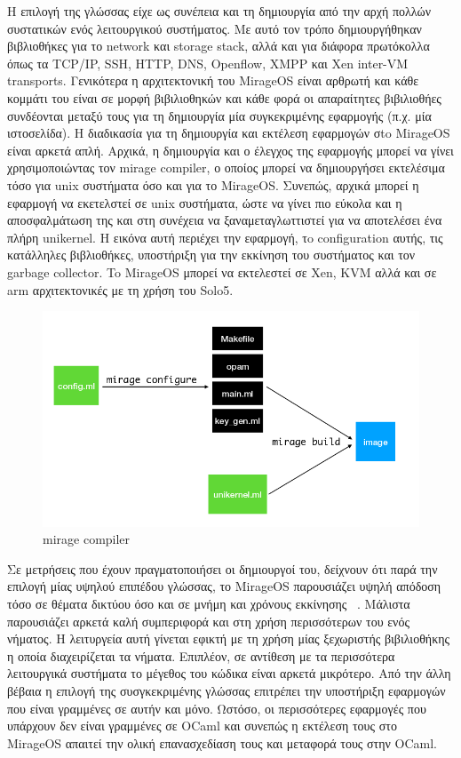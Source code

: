 Η επιλογή της γλώσσας είχε ως συνέπεια και τη δημιουργία από την αρχή πολλών
συστατικών ενός λειτουργικού συστήματος. Με αυτό τον τρόπο δημιουργήθηκαν
βιβλιοθήκες για το network και storage stack, αλλά και για διάφορα πρωτόκολλα
όπως τα TCP/IP, SSH, HTTP, DNS, Openflow, XMPP και Xen inter-VM transports.
Γενικότερα η αρχιτεκτονική του MirageOS είναι αρθρωτή και κάθε κομμάτι του είναι
σε μορφή βιβιλιοθηκών και κάθε φορά οι απαραίτητες βιβιλιοθήες συνδέονται μεταξύ
τους για τη δημιουργία μία συγκεκριμένης εφαρμογής (π.χ. μία ιστοσελίδα). H
διαδικασία για τη δημιουργία και εκτέλεση εφαρμογών σto MirageOS είναι αρκετά
απλή. Αρχικά, η δημιουργία και ο έλεγχος της εφαρμογής μπορεί να γίνει
χρησιμοποιώντας τον mirage compiler, ο οποίος μπορεί να δημιουργήσει εκτελέσιμα
τόσο για unix συστήματα όσο και για το MirageOS. Συνεπώς, αρχικά μπορεί η
εφαρμογή να εκετελστεί σε unix συστήματα, ώστε να γίνει πιο εύκολα και η
αποσφαλμάτωση της και στη συνέχεια να ξαναμεταγλωττιστεί για να αποτελέσει ένα
πλήρη unikernel. Η εικόνα αυτή περιέχει την εφαρμογή, τo configuration
αυτής, τις κατάλληλες βιβλιοθήκες, υποστήριξη για την εκκίνηση του συστήματος
και τον garbage collector. To MirageOS μπορεί να εκτελεστεί σε Xen, KVM αλλά και
σε arm αρχιτεκτονικές με τη χρήση του Solo5. 

\begin{figure}[htp]
\centering
\includegraphics[scale=0.5]{figures/mirage_compiler.png}
\caption{mirage compiler\label{fig3_7}}
\end{figure}

Σε μετρήσεις που έχουν πραγματοποιήσει οι δημιουργοί του, δείχνουν ότι παρά την
επιλογή μίας υψηλού επιπέδου γλώσσας, το MirageOS παρουσιάζει υψηλή απόδοση τόσο
σε θέματα δικτύου όσο και σε μνήμη και χρόνους εκκίνησης
~\cite{madhavapeddy2013unikernels}. Μάλιστα παρουσιάζει αρκετά καλή συμπεριφορά
και στη χρήση περισσότερων του ενός νήματος. Η λειτυργεία αυτή γίνεται εφικτή με
τη χρήση μίας ξεχωριστής βιβιλιοθήκης η οποία διαχειρίζεται τα νήματα. Επιπλέον,
σε αντίθεση με τα περισσότερα λειτουργικά συστήματα το μέγεθος του κώδικα είναι
αρκετά μικρότερο. Από την άλλη βέβαια η επιλογή της συσγκεκριμένης γλώσσας
επιτρέπει την υποστήριξη εφαρμογών που είναι γραμμένες σε αυτήν και μόνο.
Ωστόσο, οι περισσότερες εφαρμογές που υπάρχουν δεν είναι γραμμένες σε OCaml και
συνεπώς η εκτέλεση τους στο MirageOS απαιτεί την ολική επανασχεδίαση τους και
μεταφορά τους στην OCaml.

